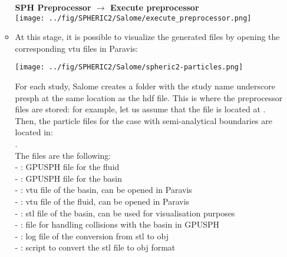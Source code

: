 \documentclass{../GPUSPHtemplate}
\begin{document}
\begin{enumerate}
\begin{itemize}
    \textbf{SPH Preprocessor $\to$ Execute preprocessor}\smallskip\\
    \texttt{[image: ../fig/SPHERIC2/Salome/execute\_preprocessor.png]}
  \item At this stage, it is possible to visualize the generated files by opening the corresponding vtu files in Paravis:\\
    \begin{center}\texttt{[image: ../fig/SPHERIC2/Salome/spheric2-particles.png]}\end{center}
    
    For each study, Salome creates a folder with the study name underscore presph at the same location as the hdf file.
    This is where the preprocessor files are stored: for example, let us assume that the  file
    is located at .
    Then, the particle files for the case with semi-analytical boundaries are located in:\\
    . \\
    The files are the following:\\
    - :  GPUSPH file for the fluid\\
    - : GPUSPH file for the basin\\
    - : vtu file of the basin, can be opened in Paravis\\
    - : vtu file of the fluid, can be opened in Paravis\\
    - : stl file of the basin, can be used for visualisation purposes\\
    - : file for handling collisions with the basin in GPUSPH\\
    - : log file of the conversion from stl to obj\\
    - : script to convert the stl file to obj format
  \end{itemize}
  

\end{enumerate}
\end{document}
